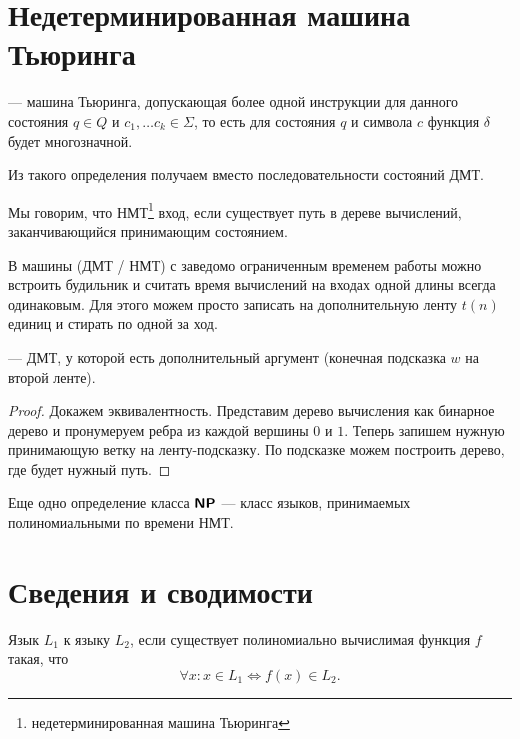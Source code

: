 \section{Недетерминированная машина Тьюринга}
\begin{defn}
	 --- машина Тьюринга, допускающая более одной инструкции для данного состояния $ q \in Q$ и $ c_1, \ldots c_k \in \Sigma $, то есть для состояния  $ q $ и символа $ c$ функция  $ \delta $ будет многозначной.
\end{defn}

Из такого определения получаем  вместо последовательности состояний ДМТ.

Мы говорим, что НМТ\footnote{недетерминированная машина Тьюринга}  вход, если существует путь в дереве вычислений, заканчивающийся принимающим состоянием.

\begin{st}
	В машины (ДМТ / НМТ) с заведомо ограниченным временем работы можно встроить \textsf{будильник} и считать время вычислений на входах одной длины всегда \textsf{одинаковым}.
	Для этого можем просто записать на дополнительную ленту $ t(n)$ единиц и стирать по одной за ход. 
\end{st}

\begin{defn}
	 --- ДМТ, у которой есть дополнительный аргумент (конечная подсказка $ w$ на второй ленте).
\end{defn}
\begin{proof}
	Докажем эквивалентность. Представим дерево вычисления как бинарное дерево и пронумеруем ребра из каждой вершины $ 0$ и $ 1$. Теперь запишем нужную принимающую ветку на ленту-подсказку.
	По подсказке можем построить дерево, где будет нужный путь.
\end{proof}
\begin{defn}
    Еще одно определение класса $ \textmd{\textbf{\textsf{NP}}}$ --- класс языков, принимаемых полиномиальными по времени НМТ.
\end{defn}

\section{Сведения и сводимости}
\begin{defn}
	Язык $ L_1$   к языку $ L_2$, если существует полиномиально вычислимая функция $ f$ такая, что
	\[
		\forall x\colon x \in L_1 \Longleftrightarrow f(x) \in L_2
	.\] 
\end{defn}

